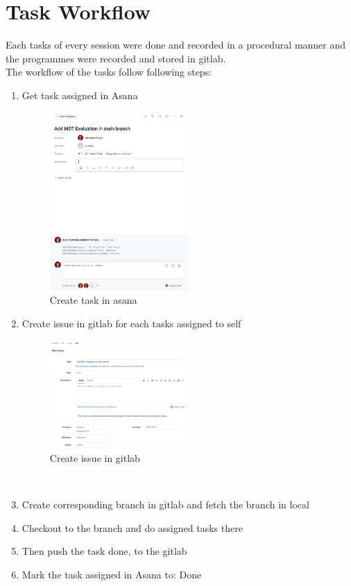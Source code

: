 	\section{Task Workflow}
	Each tasks of every session were done and recorded in a procedural manner and the programmes were recorded and stored in gitlab.\\
	The workflow of the tasks follow following steps:
	\begin{enumerate}
		\item Get task assigned in Asana
		\begin{figure}[h]
			\begin{center}
				\includegraphics[width=0.5\textwidth]{img/asana_create_task.png}
			\end{center}
			\caption{Create task in asana}    
		\end{figure}
		\item Create issue in gitlab for each tasks assigned to self
		\begin{figure}[h]
			\begin{center}
				\includegraphics[width=0.5\textwidth]{img/gitlab_create_issue.png}
			\end{center}
			\caption{Create issue in gitlab}    
		\end{figure}\\
		\item Create corresponding branch in gitlab and fetch the branch in local
		\item Checkout to the branch and do assigned tasks there
		\item Then push the task done, to the gitlab
		\item Mark the task assigned in Asana to: Done
	\end{enumerate}